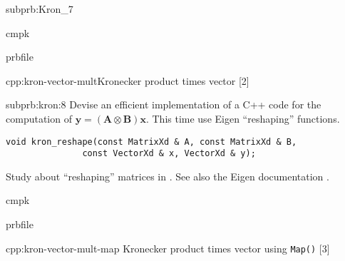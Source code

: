 \begin{samproblem}
\begin{subproblem}{subprb:Kron_7}
\begin{samwriteprbpart}{cmpk}
  \begin{writeverbatim}{prbfile}
    \begin{samsolution}
      \begin{samcode}[C++11-code]{cpp:kron-vector-mult}{Kronecker product times vector}
        [2]
      \end{samcode}
    \end{samsolution}
  \end{writeverbatim}
\end{samwriteprbpart}
\end{subproblem}

\begin{subproblem}{subprb:kron:8}
  Devise an efficient implementation of a C++ code for the computation of
  $\mathbf{y} = (\mathbf{A} \otimes \mathbf{B}) \mathbf{x}$. This time use
  Eigen ``reshaping'' functions.
  \begin{lstlisting}[style=cppsimple]
void kron_reshape(const MatrixXd & A, const MatrixXd & B,
               const VectorXd & x, VectorXd & y);
  \end{lstlisting}
  Study  about ``reshaping'' matrices in \eigen{}. See also the Eigen
  documentation .

\begin{samwriteprbpart}{cmpk}
  \begin{writeverbatim}{prbfile}
    \begin{samsolution}
      \begin{samcode}[C++11-code]{cpp:kron-vector-mult-map}
        {Kronecker product times vector using \texttt{Map()}}
        [3]
      \end{samcode}
    \end{samsolution}
  \end{writeverbatim}
\end{samwriteprbpart}
\end{subproblem}


\end{samproblem}
